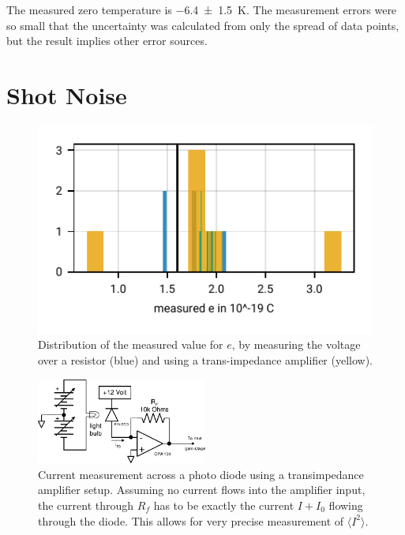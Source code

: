 \documentclass[
    parskip=half, 
    twoside=false,
    twocolumn=true,
    fontsize=11pt,
]{scrarticle}
\begin{document}
The measured zero temperature is \SI{-6.4(15)}{K}. The measurement errors were so small that the uncertainty was calculated from only the spread of data points, but the result implies other error sources.

\section{Shot Noise}
\begin{figure}[h!]
    \centering
    \includegraphics{figures/03 shot noise.pdf}
    \caption{
        Distribution of the measured value for $e$, by measuring the voltage over a resistor (blue) and using a trans-impedance amplifier (yellow).
    }
    \label{fig:shot noise}
\end{figure}
\begin{figure}[h!]
    \centering
    \includegraphics[width=0.5\textwidth]{figures/tamp_schematic.pdf}
    \caption{
        Current measurement across a photo diode using a transimpedance amplifier setup. Assuming no current flows into the amplifier input, the current through $R_f$ has to be exactly the current $I + I_0$ flowing through the diode. This allows for very precise measurement of $\langle I^2 \rangle$.
    }
    \label{fig:transimpedance schematic}
\end{figure}
\end{document}
